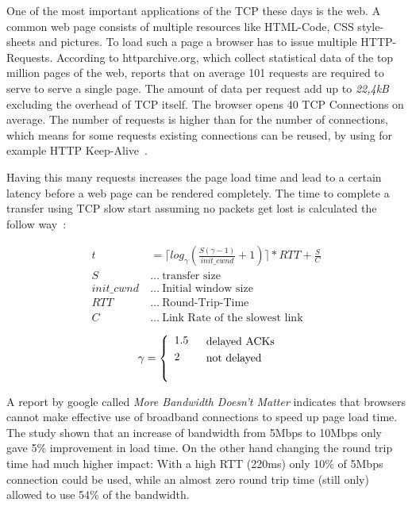 One of the most important applications of the TCP these days is the web. A
common web page consists of multiple resources like HTML-Code, CSS style-sheets
and pictures. To load such a page a browser has to issue multiple HTTP-Requests.
According to httparchive.org\cite{httparchive}, which collect statistical data
of the top million pages of the web, reports that on average 101 requests are
required to serve to serve a single page\cite{httparchive-trends}. The amount of
data per request add up to \emph{22,4kB} excluding the overhead of TCP itself.
The browser opens 40 TCP Connections on average. The number of requests is
higher than for the number of connections, which means for some requests
existing connections can be reused, by using for example HTTP
Keep-Alive~\cite{I-D.thomson-hybi-http-timeout}.

Having this many requests increases the page load time and lead to a certain
latency before a web page can be rendered completely. The time to complete a
transfer using TCP slow start assuming no packets get lost is calculated the
follow way~\cite{832574}:

\begin{align}
  t&=\lceil log_{\gamma} (\frac{S(\gamma - 1)}{init\_cwnd} + 1) \rceil * RTT +
  \frac{S}{C} \label{loadtime}\\\label{transfer_time}
  S~&\dots~\text{transfer size } \\\nonumber
  init\_cwnd~&\dots~\text{Initial window size} \\\nonumber
  RTT~&\dots~\text{Round-Trip-Time} \\\nonumber
  C~&\dots~\text{Link Rate of the slowest link} \\\nonumber
\end{align}
\begin{align}
  & && \text{delayed ACKs} \nonumber \\
  \gamma &=
    \smash{\left\{\begin{array}{lr}
       1.5 \\[\jot]
       2 \\\nonumber
       \vspace{0.5em}
   \end{array}\right.} && \text{not delayed} \\\nonumber
\end{align}

A report by google called \emph{More Bandwidth Doesn't Matter}\cite{bandwith}
indicates that browsers cannot make effective use of broadband connections to
speed up page load time. The study shown that an increase of bandwidth from
5Mbps to 10Mbps only gave 5\% improvement in load time. On the other hand
changing the round trip time had much higher impact: With a high RTT (220ms)
only 10\% of 5Mbps connection could be used, while an almost zero round trip
time (still only) allowed to use 54\% of the bandwidth.

